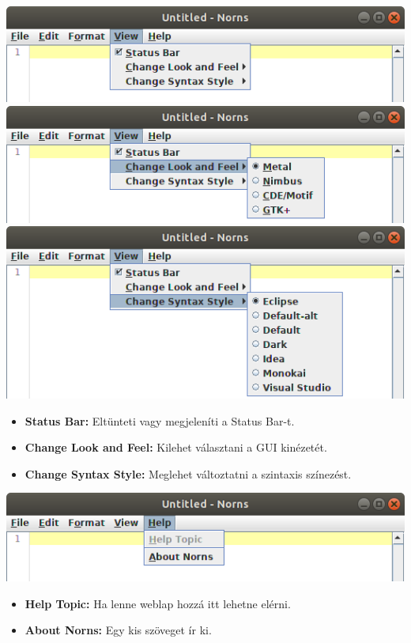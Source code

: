 \documentclass[12pt]{article}
\begin{document}
\begin{center}
  \includegraphics[width = \textwidth]{ViewMenu}
  \includegraphics[width = \textwidth]{ViewLookMenu}
  \includegraphics[width = \textwidth]{ViewSyntaxMenu}
\end{center}
\begin{itemize}
  \item \textbf{Status Bar:} Eltünteti vagy megjeleníti a Status Bar-t.
  \item \textbf{Change Look and Feel:} Kilehet választani a GUI kinézetét.
  \item \textbf{Change Syntax Style:} Meglehet változtatni a szintaxis színezést.
\end{itemize}

\includegraphics[width = \textwidth]{HelpMenu}
\begin{itemize}
  \item \textbf{Help Topic:} Ha lenne weblap hozzá itt lehetne elérni.
  \item \textbf{About Norns:} Egy kis szöveget ír ki.
\end{itemize}
\end{document}
